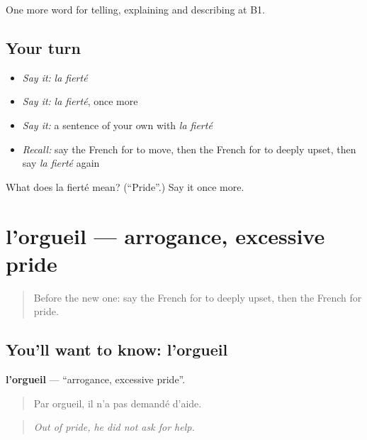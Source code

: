 \begin{grammarlens}[title={What you've built}]
One more word for telling, explaining and describing at B1.
\end{grammarlens}

\subsection*{Your turn}
\begin{itemize}
\raggedright
  \item \emph{Say it:} \emph{la fierté}
  \item \emph{Say it:} \emph{la fierté}, once more
  \item \emph{Say it:} a sentence of your own with \emph{la fierté}
  \item \emph{Recall:} say the French for to move, then the French for to deeply upset, then say \emph{la fierté} again
\end{itemize}

\begin{tcolorbox}[breakable,colback=teal!4,colframe=teal!35!black,title={Before you move on}]
What does la fierté mean? (\textquotedblleft{}Pride\textquotedblright{}.) Say it once more.
\end{tcolorbox}
\section[l'orgueil]{l'orgueil — arrogance, excessive pride}

\label{lesson:FR-C473-orgueil}



\begin{quote}
Before the new one: say the French for to deeply upset, then the French for pride.
\end{quote}

\subsection*{You'll want to know: l'orgueil}
\textbf{l'orgueil} — \textquotedblleft{}arrogance, excessive pride\textquotedblright{}.

\begin{quote}
Par orgueil, il n'a pas demandé d'aide.
\end{quote}

\begin{quote}
\emph{Out of pride, he did not ask for help.}
\end{quote}

